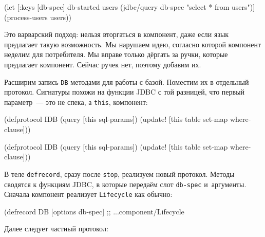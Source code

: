 \else

\begin{english}
  \begin{clojure}
(let [{:keys [db-spec]} db-started
      users (jdbc/query db-spec "select * from users")]
  (process-users users))
  \end{clojure}
\end{english}

\fi

Это варварский подход: нельзя вторгаться в компонент, даже если язык предлагает
такую возможность. Мы нарушаем идею, согласно которой компонент неделим для
потребителя. Мы вправе только дёргать за ручки, которые предлагает
компонент. Сейчас ручек нет, поэтому добавим их.

Расширим запись \verb|DB| методами для работы с базой. Поместим их в отдельный
протокол. Сигнатуры похожи на функции JDBC с той разницей, что первый параметр~---
это не спека, а \verb|this|, компонент:


\ifx\DEVICETYPE\MOBILE

\begin{english}
  \begin{clojure}
(defprotocol IDB
  (query [this sql-params])
  (update!
    [this table set-map where-clause]))
  \end{clojure}
\end{english}

\else

\begin{english}
  \begin{clojure}
(defprotocol IDB
  (query [this sql-params])
  (update! [this table set-map where-clause]))
  \end{clojure}
\end{english}

\fi

В теле \verb|defrecord|, сразу после \verb|stop|, реализуем новый
протокол. Методы сводятся к функциям JDBC, в которые передаём слот
\verb|db-spec| и~аргументы. Сначала компонент реализует \verb|Lifecycle| как
обычно:

\begin{english}
  \begin{clojure}
(defrecord DB [options db-spec]
  ;; ...component/Lifecycle
  \end{clojure}
\end{english}

\noindent
Далее следует частный протокол:

